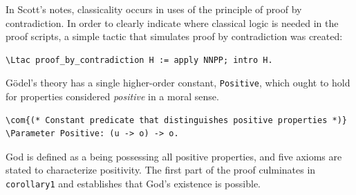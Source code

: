 \documentclass{llncs}
\newcommand{\red}[1]{\textcolor[rgb]{1,0,0}{#1}}
\newcommand{\brown}[1]{\textcolor[rgb]{0.8,0.6,0.4}{#1}}
\newcommand{\Parameter}{\red{Parameter}}
\newcommand{\Ltac}{\red{Ltac}}
\newcommand{\com}[1]{\brown{#1}}
\begin{document}
\noindent 
In Scott's notes, classicality occurs in uses of the
principle of proof by contradiction. In order to clearly
indicate where classical logic is needed in the proof scripts, a
simple tactic that simulates proof by contradiction was created:

\begin{Verbatim}[commandchars=\\\{\},fontsize=\verbsize]
\Ltac proof_by_contradiction H := apply NNPP; intro H.
\end{Verbatim}


\noindent
G\"odel's theory has a single higher-order constant, \texttt{Positive}, 
which ought to hold for properties considered \emph{positive} in a moral sense.

\begin{Verbatim}[commandchars=\\\{\},fontsize=\verbsize]
\com{(* Constant predicate that distinguishes positive properties *)}
\Parameter Positive: (u -> o) -> o.
\end{Verbatim}

\noindent
God is defined as a being possessing all positive properties, and
five axioms are stated to characterize positivity. 
The first part of the proof culminates in \texttt{corollary1} and establishes
that God's existence is possible.
\end{document}
